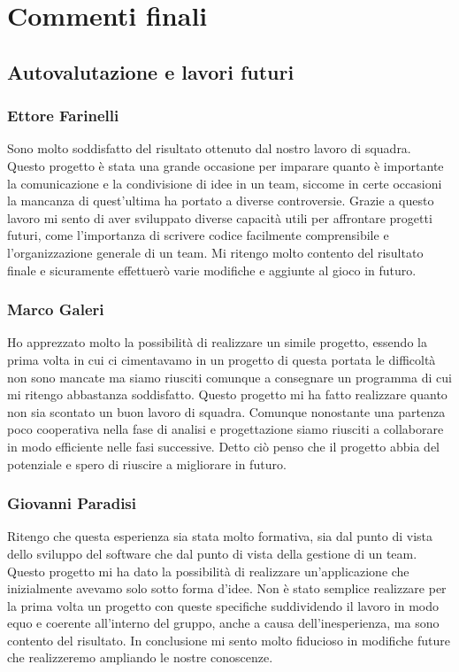 \documentclass[a4paper,12pt]{report}
\begin{document}
\chapter{Commenti finali}

\section{Autovalutazione e lavori futuri}
\subsection*{Ettore Farinelli}
Sono molto soddisfatto del risultato ottenuto dal nostro lavoro di squadra. Questo progetto è stata una grande occasione per 
imparare quanto è importante la comunicazione e la condivisione di idee in un team, siccome in certe occasioni la mancanza di 
quest'ultima ha portato a diverse controversie. Grazie a questo lavoro mi sento di aver sviluppato diverse capacità utili per 
affrontare progetti futuri, come l'importanza di scrivere codice facilmente comprensibile e l'organizzazione generale di un team.
Mi ritengo molto contento del risultato finale e sicuramente effettuerò varie modifiche e aggiunte al gioco in futuro.
\subsection*{Marco Galeri}
Ho apprezzato molto la possibilità di realizzare un simile progetto, essendo la prima volta in cui ci cimentavamo in un progetto di questa portata le difficoltà non sono mancate ma siamo riusciti comunque a consegnare un programma di cui mi ritengo abbastanza soddisfatto.
 Questo progetto mi ha fatto realizzare quanto non sia scontato un buon lavoro di squadra.
 Comunque nonostante una partenza poco cooperativa nella fase di analisi e progettazione siamo riusciti a collaborare in modo efficiente nelle fasi successive.
 Detto ciò penso che il progetto abbia del potenziale e spero di riuscire a migliorare in futuro.
\subsection*{Giovanni Paradisi}
Ritengo che questa esperienza sia stata molto formativa, sia dal punto di vista dello sviluppo del software che dal punto di vista della gestione di un team.
Questo progetto mi ha dato la possibilità di realizzare un'applicazione che inizialmente avevamo solo sotto forma d'idee.
Non è stato semplice realizzare per la prima volta un progetto con queste specifiche suddividendo il lavoro in modo equo e coerente all'interno del gruppo, anche a causa dell'inesperienza, ma sono contento del risultato.
In conclusione mi sento molto fiducioso in modifiche future che realizzeremo ampliando le nostre conoscenze.
\end{document}
